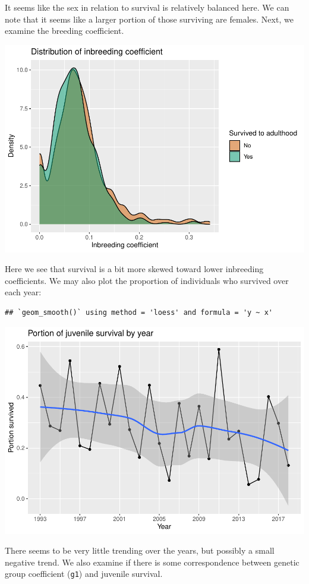 It seems like the sex in relation to survival is relatively balanced
here. We can note that it seems like a larger portion of those surviving
are females. Next, we examine the breeding coefficient.

\includegraphics{EDA_files/figure-latex/unnamed-chunk-8-1.pdf}

Here we see that survival is a bit more skewed toward lower inbreeding
coefficients. We may also plot the proportion of individuals who survived
over each year:

\begin{verbatim}
## `geom_smooth()` using method = 'loess' and formula = 'y ~ x'
\end{verbatim}

\includegraphics{EDA_files/figure-latex/unnamed-chunk-9-1.pdf}

There seems to be very little trending over the years, but possibly a
small negative trend. We also examine if there is some correspondence
between genetic group coefficient (\texttt{g1}) and juvenile survival.

